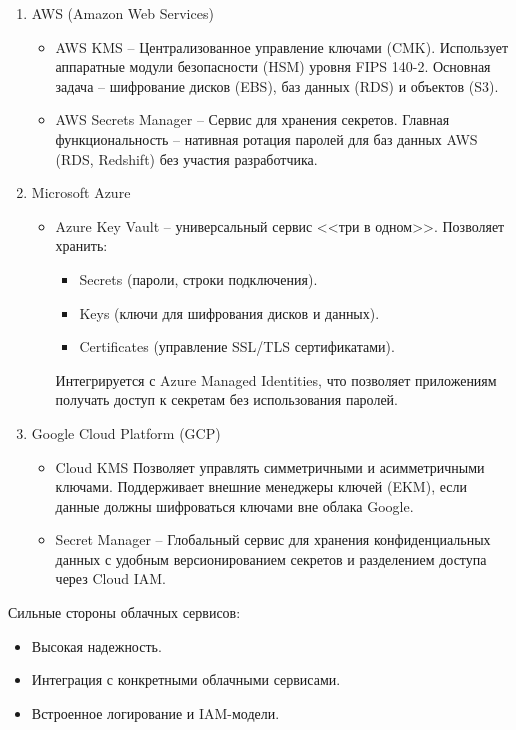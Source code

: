 \documentclass[14pt, a4paper]{extarticle}
\begin{document}
\begin{enumerate}
	\begin{enumerate}[label=\theenumi.\arabic*, ref=\theenumi.\arabic*]
	\item AWS (Amazon Web Services)
	\begin{itemize}
	\item AWS KMS -- Централизованное управление ключами (CMK). Использует аппаратные модули безопасности (HSM) уровня FIPS 140-2. Основная задача -- шифрование дисков (EBS), баз данных (RDS) и объектов (S3).
	\item AWS Secrets Manager -- Сервис для хранения секретов. Главная функциональность -- нативная ротация паролей для баз данных AWS (RDS, Redshift) без участия разработчика.
	\end{itemize}
	\item Microsoft Azure
	\begin{itemize}
		\item Azure Key Vault -- универсальный сервис <<три в одном>>. Позволяет хранить:
		\begin{itemize}[label=--]
		\item Secrets (пароли, строки подключения).
		\item Keys (ключи для шифрования дисков и данных).
		\item Certificates (управление SSL/TLS сертификатами).
		\end{itemize}
		Интегрируется с Azure Managed Identities, что позволяет приложениям получать доступ к секретам без использования паролей.
	\end{itemize}
	\item Google Cloud Platform (GCP)
	\begin{itemize}
	\item Cloud KMS Позволяет управлять симметричными и асимметричными ключами. Поддерживает внешние менеджеры ключей (EKM), если данные должны шифроваться ключами вне облака Google.
	\item Secret Manager -- Глобальный сервис для хранения конфиденциальных данных с удобным версионированием секретов и разделением доступа через Cloud IAM.
	\end{itemize}
	\end{enumerate}
	
	Сильные стороны облачных сервисов:
	
	\begin{itemize}
	\item Высокая надежность.
	\item Интеграция с конкретными облачными сервисами.
	\item Встроенное логирование и IAM-модели.
	\end{itemize}
	

\end{enumerate}
\end{document}
